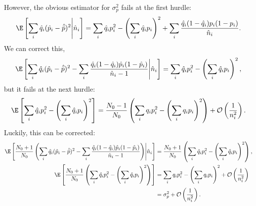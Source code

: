 \documentclass[12pt]{article}
\begin{document}
However, the obvious estimator for $\sigma_p^2$ fails at the first hurdle:
%
\begin{equation}\label{eq:sigest1}
  \E\brk{\sum_i\hat{q}_i(\hat{p}_i-\hat{\bar{p}})^2\middle|\hat{n}_i} = \sum_i \hat{q}_i p_i^2 - \prn{\sum_i \hat{q}_ip_i}^2 + \sum_i \frac{\hat{q}_i (1-\hat{q}_i)p_i(1-p_i)}{\hat{n}_i}.
\end{equation}
%
We can correct this,
%
\begin{equation}\label{eq:sigest2}
  \E\brk{\sum_i\hat{q}_i(\hat{p}_i-\hat{\bar{p}})^2 - \sum_i \frac{\hat{q}_i (1-\hat{q}_i)\hat{p}_i(1-\hat{p}_i)}{\hat{n}_i-1} \middle|\hat{n}_i} = \sum_i \hat{q}_i p_i^2 - \prn{\sum_i \hat{q}_ip_i}^2 ,
\end{equation}
%
but it fails at the next hurdle:
%
\begin{equation}\label{eq:sigest3}
  \E\brk{\sum_i \hat{q}_i p_i^2 - \prn{\sum_i \hat{q}_ip_i}^2 } = \frac{N_0-1}{N_0}\prn{\sum_i q_i p_i^2 - \prn{\sum_i q_ip_i}^2} + \CO\prn{\frac{1}{n_i^2}}.
\end{equation}
%
Luckily, this can be corrected:
%
\begin{equation}\label{eq:sigest4}
\begin{aligned}
  \E\brk{\frac{N_0+1}{N_0}\prn{\sum_i\hat{q}_i(\hat{p}_i-\hat{\bar{p}})^2 - \sum_i \frac{\hat{q}_i (1-\hat{q}_i)\hat{p}_i(1-\hat{p}_i)}{\hat{n}_i-1} } \middle|\hat{n}_i} &= \frac{N_0+1}{N_0}\prn{\sum_i \hat{q}_i p_i^2 - \prn{\sum_i \hat{q}_ip_i}^2} ,\\
  \E\brk{\frac{N_0+1}{N_0}\prn{\sum_i \hat{q}_i p_i^2 - \prn{\sum_i \hat{q}_ip_i}^2} } &= \sum_i q_i p_i^2 - \prn{\sum_i q_ip_i}^2 + \CO\prn{\frac{1}{n_i^2}} \\&= \sigma_p^2 + \CO\prn{\frac{1}{n_i^2}}.
\end{aligned}
\end{equation}
%
\end{document}
